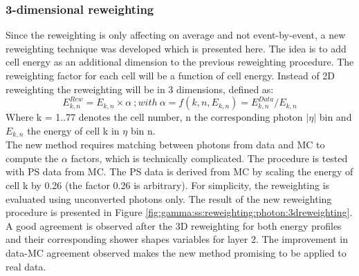 \label{tab:avg}


\subsubsection{3-dimensional reweighting}
Since the reweighting is only affecting on average and not event-by-event, a new reweighting technique was developed which is presented here. The idea is to add cell energy as an additional dimension to the previous reweighting procedure. The reweighting factor for each cell will be a function of cell energy. Instead of 2D reweighting the reweighting will be in 3 dimensions, defined as:
\begin{equation}
    E_{k,n}^{Rew} = E_{k,n} \times \alpha \ ; with \ \alpha = f(k,n,E_{k,n}) = E_{k,n}^{Data}/E_{k,n}
\end{equation}
Where k = 1..77 denotes the cell number, n the corresponding photon $|\eta|$ bin and $E_{k,n}$  the energy of cell k in $\eta$ bin n. \\
The new method requires matching between photons from data and MC to compute the $\alpha$ factors, which is technically complicated. The procedure is tested with PS data from MC. The PS data is derived from MC by scaling the energy of cell k by 0.26 (the factor 0.26 is arbitrary). For simplicity, the reweighting is evaluated using unconverted photons only.
The result of the new reweighting procedure is presented in Figure \ref{fig:gamma:ss:reweighting:photon:3dreweighting}. A good agreement is observed after the 3D reweighting for both energy profiles and their corresponding shower shapes variables for layer 2. The improvement in data-MC agreement observed makes the new method promising to be applied to real data.
